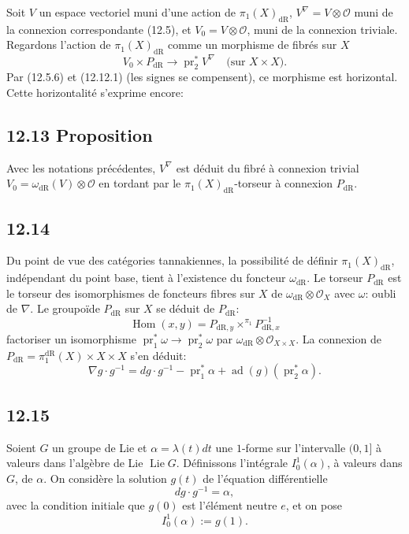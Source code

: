 \documentclass[12pt,a4paper]{article}
\theoremstyle{plain}
\theoremstyle{definition}
\theoremstyle{remark}
\DeclareMathOperator{\Lie}{Lie}
\DeclareMathOperator{\Hom}{Hom}
\DeclareMathOperator{\pr}{pr}
\DeclareMathOperator{\ad}{ad}
\newcommand{\cO}{\mathcal{O}}
\newcommand{\dr}{\mathrm{dR}}
\begin{document}
Soit $V$ un espace vectoriel muni d'une action de $\pi_1(X)_{\dr}$, $V^\nabla = V \otimes \cO$ muni de la connexion correspondante (12.5), et $V_0 = V \otimes \cO$, muni de la connexion triviale. Regardons l'action de $\pi_1(X)_{\dr}$ comme un morphisme de fibrés sur $X$
\begin{equation}\label{eq:12.12.2}
V_0 \times P_{\dr} \to \pr_2^* V^\nabla \quad \text{(sur } X \times X \text{)}.
\end{equation}
Par (12.5.6) et (12.12.1) (les signes se compensent), ce morphisme est horizontal. Cette horizontalité s'exprime encore:

\subsection*{12.13 Proposition}

Avec les notations précédentes, $V^\nabla$ est déduit du fibré à connexion trivial $V_0 = \omega_{\dr}(V) \otimes \cO$ en tordant par le $\pi_1(X)_{\dr}$-torseur à connexion $P_{\dr}$.

\subsection*{12.14}

Du point de vue des catégories tannakiennes, la possibilité de définir $\pi_1(X)_{\dr}$, indépendant du point base, tient à l'existence du foncteur $\omega_{\dr}$. Le torseur $P_{\dr}$ est le torseur des isomorphismes de foncteurs fibres sur $X$ de $\omega_{\dr} \otimes \cO_X$ avec $\omega$: oubli de $\nabla$. Le groupoïde $P_{\dr}$ sur $X$ se déduit de $P_{\dr}$:
\begin{equation}\label{eq:12.14.1}
\Hom(x,y) = P_{\dr,y} \times^{\pi_1} P_{\dr,x}^{-1}
\end{equation}
factoriser un isomorphisme $\pr_1^* \omega \to \pr_2^* \omega$ par $\omega_{\dr} \otimes \cO_{X \times X}$. La connexion de $P_{\dr} = \pi_1^{\dr}(X) \times X \times X$ s'en déduit:
\begin{equation}\label{eq:12.14.2}
\nabla g \cdot g^{-1} = dg \cdot g^{-1} - \pr_1^* \alpha + \ad(g)(\pr_2^* \alpha).
\end{equation}

\subsection*{12.15}

Soient $G$ un groupe de Lie et $\alpha = \lambda(t)dt$ une $1$-forme sur l'intervalle $(0,1]$ à valeurs dans l'algèbre de Lie $\Lie G$. Définissons l'intégrale $I_0^1(\alpha)$, à valeurs dans $G$, de $\alpha$. On considère la solution $g(t)$ de l'équation différentielle
\[
dg \cdot g^{-1} = \alpha,
\]
avec la condition initiale que $g(0)$ est l'élément neutre $e$, et on pose
\[
I_0^1(\alpha) := g(1).
\]
\end{document}
